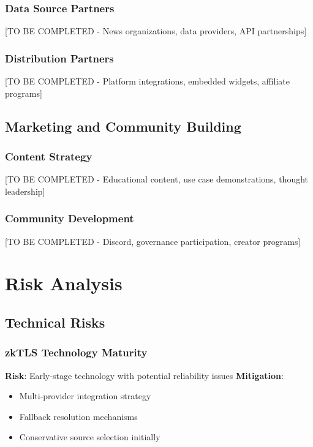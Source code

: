 \documentclass[11pt,a4paper]{article}
\begin{document}
\subsubsection{Data Source Partners}
[TO BE COMPLETED - News organizations, data providers, API partnerships]

\subsubsection{Distribution Partners}
[TO BE COMPLETED - Platform integrations, embedded widgets, affiliate programs]

\subsection{Marketing and Community Building}

\subsubsection{Content Strategy}
[TO BE COMPLETED - Educational content, use case demonstrations, thought leadership]

\subsubsection{Community Development}
[TO BE COMPLETED - Discord, governance participation, creator programs]

\section{Risk Analysis}

\subsection{Technical Risks}

\subsubsection{zkTLS Technology Maturity}
\textbf{Risk}: Early-stage technology with potential reliability issues
\textbf{Mitigation}:
\begin{itemize}
    \item Multi-provider integration strategy
    \item Fallback resolution mechanisms
    \item Conservative source selection initially
\end{itemize}
\end{document}
